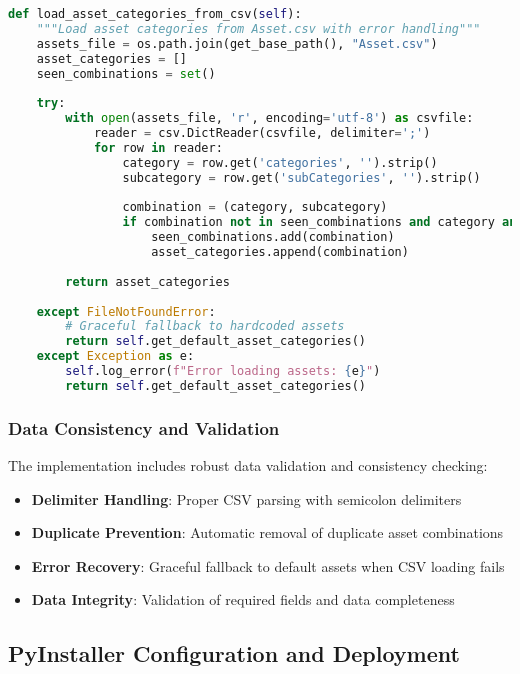 \documentclass[binding=0.6cm]{sapthesis}
\begin{document}
\begin{lstlisting}[language=Python, caption=Enhanced Asset Loading Implementation]
def load_asset_categories_from_csv(self):
    """Load asset categories from Asset.csv with error handling"""
    assets_file = os.path.join(get_base_path(), "Asset.csv")
    asset_categories = []
    seen_combinations = set()
    
    try:
        with open(assets_file, 'r', encoding='utf-8') as csvfile:
            reader = csv.DictReader(csvfile, delimiter=';')
            for row in reader:
                category = row.get('categories', '').strip()
                subcategory = row.get('subCategories', '').strip()
                
                combination = (category, subcategory)
                if combination not in seen_combinations and category and subcategory:
                    seen_combinations.add(combination)
                    asset_categories.append(combination)
        
        return asset_categories
        
    except FileNotFoundError:
        # Graceful fallback to hardcoded assets
        return self.get_default_asset_categories()
    except Exception as e:
        self.log_error(f"Error loading assets: {e}")
        return self.get_default_asset_categories()
\end{lstlisting}

\subsubsection{Data Consistency and Validation}

The implementation includes robust data validation and consistency checking:

\begin{itemize}
    \item \textbf{Delimiter Handling}: Proper CSV parsing with semicolon delimiters
    \item \textbf{Duplicate Prevention}: Automatic removal of duplicate asset combinations
    \item \textbf{Error Recovery}: Graceful fallback to default assets when CSV loading fails
    \item \textbf{Data Integrity}: Validation of required fields and data completeness
\end{itemize}

\subsection{PyInstaller Configuration and Deployment}
\end{document}
